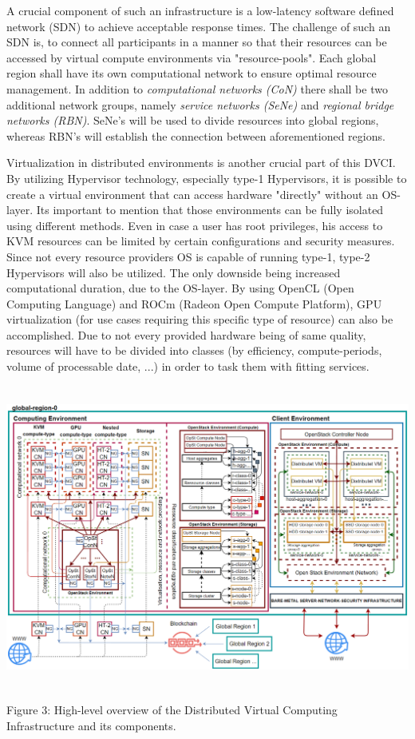 \documentclass[]{article}
\begin{document}
A crucial component of such an infrastructure is a low-latency software defined network (SDN) to achieve acceptable response times.
The challenge of such an SDN is, to connect all participants in a manner so that their resources can be accessed by virtual compute environments via "resource-pools".
Each global region shall have its own computational network to ensure optimal resource management.
In addition to \textit{computational networks (CoN)} there shall be two additional network groups, namely \textit{service networks (SeNe)} and \textit{regional bridge networks (RBN)}.
SeNe's will be used to divide resources into global regions, whereas RBN's will establish the connection between aforementioned regions.

Virtualization in distributed environments is another crucial part of this DVCI.
By utilizing Hypervisor technology, especially type-1 Hypervisors, it is possible to create a virtual environment that can access hardware "directly" without an OS-layer.
Its important to mention that those environments can be fully isolated using different methods.
Even in case a user has root privileges, his access to KVM resources can be limited by certain configurations and security measures.
Since not every resource providers OS is capable of running type-1, type-2 Hypervisors will also be utilized.
The only downside being increased computational duration, due to the OS-layer.
By using OpenCL (Open Computing Language) and ROCm (Radeon Open Compute Platform), GPU virtualization (for use cases requiring this specific type of resource) can also be accomplished.
Due to not every provided hardware being of same quality, resources will have to be divided into classes (by efficiency, compute-periods, volume of processable date, ...) in order to task them with fitting services.

\begin{center}
	\includegraphics[height=10cm]{dvci-arch-overview}
\end{center}
\begin{center}
	Figure 3: High-level overview of the Distributed Virtual Computing Infrastructure and its components.
\end{center}
\end{document}
